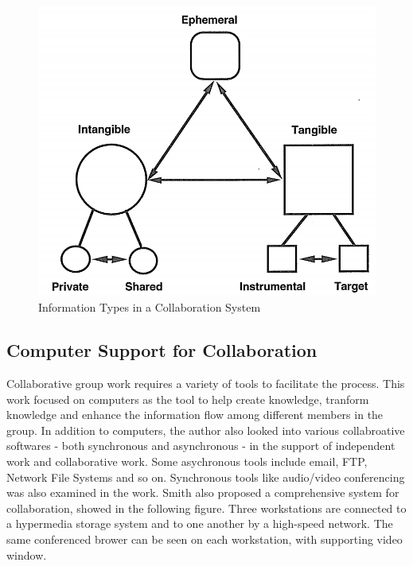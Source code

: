 \begin{figure}[!h]
\centering
\includegraphics[width=0.9\columnwidth]{figure/IPS}
\caption{Information Types in a Collaboration System}
\label{fig:IPS}
\end{figure}

\subsection{Computer Support for Collaboration}
Collaborative group work requires a variety of tools to facilitate the process. This work focused on computers as the tool to help create knowledge, tranform knowledge and enhance the information flow among different members in the group. In addition to computers, the author also looked into various collabroative softwares - both synchronous and asynchronous - in the support of independent work and collaborative work. Some asychronous tools include email, FTP, Network File Systems and so on. Synchronous tools like audio/video conferencing was also examined in the work. Smith also proposed a comprehensive system for collaboration, showed in the following figure. Three workstations are connected to a hypermedia storage system and to one another by a high-speed network. The same conferenced brower can be seen on each workstation, with supporting video window. 


